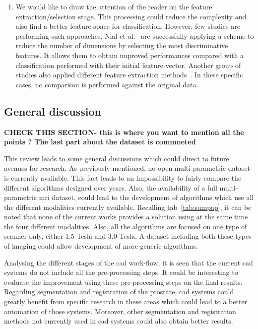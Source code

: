 \begin{enumerate}
\item We would like to draw the attention of the reader on the feature extraction/selection stage.
This processing could reduce the complexity and also find a better feature space for classification.
However, few studies are performing such approaches.
Niaf et al.~\cite{Niaf2011,Niaf2012} are successfully applying a scheme to reduce the number of dimensions by selecting the most discriminative features.
It allows them to obtain improved performances compared with a classification performed with their initial feature vector.
Another group of studies also applied different feature extraction methods~\cite{Viswanath2008a,Viswanath2008,Viswanath2012,Tiwari2007,Tiwari2008,Tiwari2009,Tiwari2010,Tiwari2012,Tiwari2013}.
In these specific cases, no comparison is performed against the original data.
\end{enumerate}

\subsection{General discussion}\label{subsec:chp3:dis:gen-dis}

{\color{red} \textbf{CHECK THIS SECTION- this is where you want to mention all the points ? The last part about the dataset is commneted}}

This review leads to some general discussions which could direct to future avenues for research.
As previously mentioned, no open multi-parametric dataset is currently available.
This fact leads to an impossibility to fairly compare the different algorithms designed over years.
Also, the availability of a full multi-parametric \ac{mri} dataset, could lead to the development of algorithms which use all the different modalities currently available.
Recalling \ac{tab}~\ref{tab:sumpap}, it can be noted that none of the current works provides a solution using at the same time the four different modalities.
Also, all the algorithms are focused on one type of scanner only, either 1.5 Tesla and 3.0 Tesla.
A dataset including both these types of imaging could allow development of more generic algorithms.

Analysing the different stages of the \ac{cad} work-flow, it is seen that the current \ac{cad} systems do not include all the pre-processing steps.
It could be interesting to evaluate the improvement using these pre-processing steps on the final results.
Regarding segmentation and registration of the prostate, \ac{cad} systems could greatly benefit from specific research in these areas which could lead to a better automation of those systems.
Moreover, other segmentation and registration methods not currently used in \ac{cad} systems could also obtain better results.

